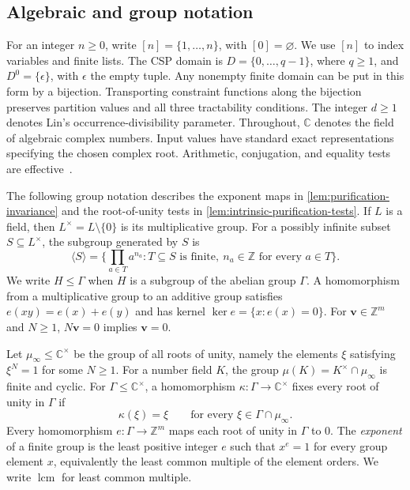 \documentclass[11pt,letterpaper,onecolumn]{article}
\theoremstyle{plain}
\theoremstyle{definition}
\theoremstyle{remark}
\newcommand{\AlgNums}{\mathbb C}
\newcommand{\emptytuple}{\epsilon}
\DeclareMathOperator{\lcm}{lcm}
\begin{document}
\subsection{Algebraic and group notation}

For an integer $n\ge0$, write $[n]=\{1,\ldots,n\}$, with
$[0]=\varnothing$.  We use $[n]$ to index variables and finite lists.
The CSP domain is $D=\{0,\ldots,q-1\}$, where $q\ge1$, and
$D^0=\{\emptytuple\}$, with $\emptytuple$ the empty tuple.
Any nonempty finite domain can be put in this form by a bijection.
Transporting constraint functions along the bijection preserves partition
values and all three tractability conditions.
The integer $d\ge1$ denotes Lin's occurrence-divisibility parameter.
Throughout, $\mathbb C$ denotes the field of algebraic complex numbers.
Input values have standard exact representations specifying the chosen
complex root.  Arithmetic, conjugation, and equality tests are
effective~\cite[Section~4.2]{Cohen1993}.

The following group notation describes the exponent maps in
\cref{lem:purification-invariance} and the root-of-unity tests in
\cref{lem:intrinsic-purification-tests}.  If $L$ is a field,
then $L^\times=L\setminus\{0\}$ is its multiplicative group.  For a possibly
infinite subset $S\subseteq L^\times$, the subgroup generated by $S$ is
\[
  \langle S\rangle
  =\biggl\{\prod_{a\in T}a^{n_a}:
      T\subseteq S\text{ is finite},\
      n_a\in\mathbb Z\text{ for every }a\in T\biggr\}.
\]
We write $H\le\Gamma$ when $H$ is a subgroup of the abelian group
$\Gamma$.  A homomorphism from a multiplicative group to an additive
group satisfies $e(xy)=e(x)+e(y)$ and has kernel
$\ker e=\{x:e(x)=0\}$.  For $\mathbf v\in\mathbb Z^m$ and $N\ge1$,
$N\mathbf v=0$ implies $\mathbf v=0$.

Let $\mu_\infty\le\AlgNums^\times$ be the group of all roots of unity,
namely the elements $\xi$ satisfying $\xi^N=1$ for some $N\ge1$.
For a number field $K$, the group $\mu(K)=K^\times\cap\mu_\infty$ is
finite and cyclic.  For $\Gamma\le\AlgNums^\times$, a homomorphism
$\kappa:\Gamma\to\mathbb C^\times$ fixes every root of unity in $\Gamma$ if
\begin{equation}
  \kappa(\xi)=\xi
  \qquad\text{for every }\xi\in\Gamma\cap\mu_\infty.
  \label{eq:fixes-torsion-definition}
\end{equation}
Every homomorphism $e:\Gamma\to\mathbb Z^m$ maps each root of unity in
$\Gamma$ to $0$.
The \emph{exponent} of a finite group is the least positive integer $e$
such that $x^e=1$ for every group element $x$, equivalently the least
common multiple of the element orders.  We write $\lcm$ for least
common multiple.
\end{document}
